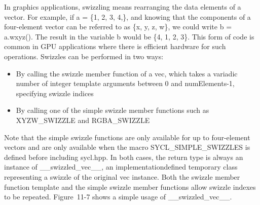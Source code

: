 In graphics applications, swizzling means rearranging the data elements of a vector. For example, if a = \{1, 2, 3, 4,\}, and knowing that the components of a four-element vector can be referred to as \{x, y, z, w\}, we could write b = a.wxyz(). The result in the variable b would be \{4, 1, 2, 3\}. This form of code is common in GPU applications where there is efficient hardware for such operations. Swizzles can be performed in two ways:\par

\begin{itemize}
	\item By calling the swizzle member function of a vec, which takes a variadic number of integer template arguments between 0 and numElements-1, specifying swizzle indices
	\item By calling one of the simple swizzle member functions such as XYZW\_SWIZZLE and RGBA\_SWIZZLE
\end{itemize}

Note that the simple swizzle functions are only available for up to four-element vectors and are only available when the macro SYCL\_SIMPLE\_SWIZZLES is defined before including sycl.hpp. In both cases, the return type is always an instance of \_\_swizzled\_vec\_\_, an implementationdefined temporary class representing a swizzle of the original vec instance. Both the swizzle member function template and the simple swizzle member functions allow swizzle indexes to be repeated. Figure 11-7 shows a simple usage of \_\_swizzled\_vec\_\_.\par

